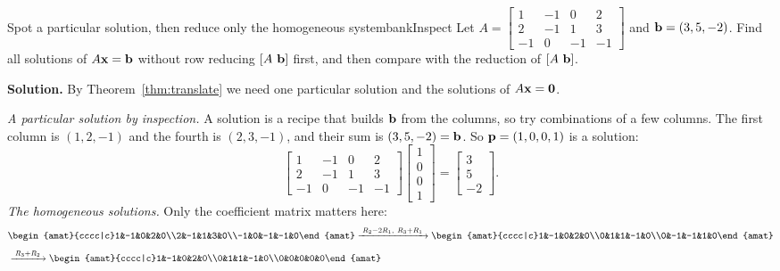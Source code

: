 \documentclass[11pt]{article}
\begin{document}
\begin{exmp}{Spot a particular solution, then reduce only the homogeneous system}{bankInspect}
Let $A=\begin{bmatrix}1&-1&0&2\\2&-1&1&3\\-1&0&-1&-1\end{bmatrix}$ and $\mathbf{b}=(3,5,-2)$. Find all solutions of $A\mathbf{x}=\mathbf{b}$ without row reducing $[A\ \bv{b}]$ first, and then compare with the reduction of $[A\ \bv{b}]$.

\textbf{Solution.} By Theorem~\ref{thm:translate} we need one particular solution and the solutions of $A\mathbf{x}=\mathbf{0}$.

\emph{A particular solution by inspection.} A solution is a recipe that builds $\mathbf{b}$ from the columns, so try combinations of a few columns. The first column is $(1,2,-1)$ and the fourth is $(2,3,-1)$, and their sum is $(3,5,-2)=\mathbf{b}$. So $\mathbf{p}=(1,0,0,1)$ is a solution:
\[
\begin{bmatrix}1&-1&0&2\\2&-1&1&3\\-1&0&-1&-1\end{bmatrix}\begin{bmatrix}1\\0\\0\\1\end{bmatrix}=\begin{bmatrix}3\\5\\-2\end{bmatrix}.
\]
\emph{The homogeneous solutions.} Only the coefficient matrix matters here:
\begin{align*}
&\begin{amat}{cccc|c}1&-1&0&2&0\\2&-1&1&3&0\\-1&0&-1&-1&0\end{amat}
\rops{R_2-2R_1,\ R_3+R_1}
\begin{amat}{cccc|c}1&-1&0&2&0\\0&1&1&-1&0\\0&-1&-1&1&0\end{amat}\\[4pt]
&\rops{R_3+R_2}
\begin{amat}{cccc|c}1&-1&0&2&0\\0&1&1&-1&0\\0&0&0&0&0\end{amat}\\[4pt]

\end{align*}
\end{exmp}
\end{document}
